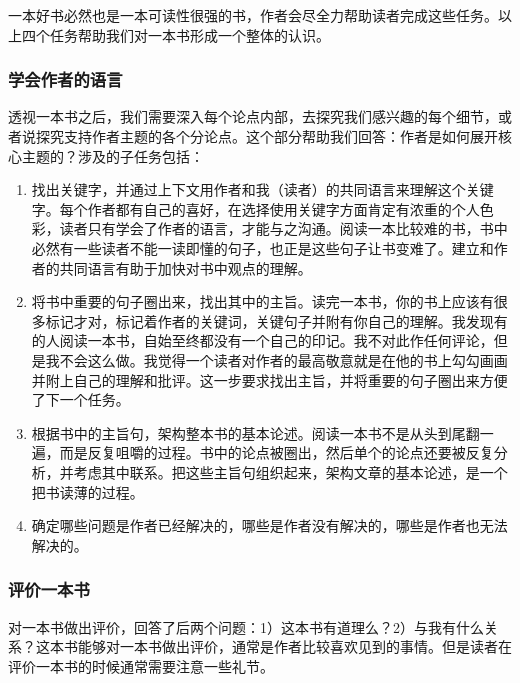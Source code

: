 \documentclass[10pt,a4paper,UTF8]{article}
\begin{document}
一本好书必然也是一本可读性很强的书，作者会尽全力帮助读者完成这些任务。以上四个任务帮助我们对一本书形成一个整体的认识。

\subsubsection{学会作者的语言}
\label{sec:orgheadline5}


透视一本书之后，我们需要深入每个论点内部，去探究我们感兴趣的每个细节，或者说探究支持作者主题的各个分论点。这个部分帮助我们回答：作者是如何展开核心主题的？涉及的子任务包括：

\begin{enumerate}
\item 找出关键字，并通过上下文用作者和我（读者）的共同语言来理解这个关键字。每个作者都有自己的喜好，在选择使用关键字方面肯定有浓重的个人色彩，读者只有学会了作者的语言，才能与之沟通。阅读一本比较难的书，书中必然有一些读者不能一读即懂的句子，也正是这些句子让书变难了。建立和作者的共同语言有助于加快对书中观点的理解。

\item 将书中重要的句子圈出来，找出其中的主旨。读完一本书，你的书上应该有很多标记才对，标记着作者的关键词，关键句子并附有你自己的理解。我发现有的人阅读一本书，自始至终都没有一个自己的印记。我不对此作任何评论，但是我不会这么做。我觉得一个读者对作者的最高敬意就是在他的书上勾勾画画并附上自己的理解和批评。这一步要求找出主旨，并将重要的句子圈出来方便了下一个任务。

\item 根据书中的主旨句，架构整本书的基本论述。阅读一本书不是从头到尾翻一遍，而是反复咀嚼的过程。书中的论点被圈出，然后单个的论点还要被反复分析，并考虑其中联系。把这些主旨句组织起来，架构文章的基本论述，是一个把书读薄的过程。

\item 确定哪些问题是作者已经解决的，哪些是作者没有解决的，哪些是作者也无法解决的。
\end{enumerate}
\subsubsection{评价一本书}
\label{sec:orgheadline6}


对一本书做出评价，回答了后两个问题：1）这本书有道理么？2）与我有什么关系？这本书能够对一本书做出评价，通常是作者比较喜欢见到的事情。但是读者在评价一本书的时候通常需要注意一些礼节。
\end{document}
